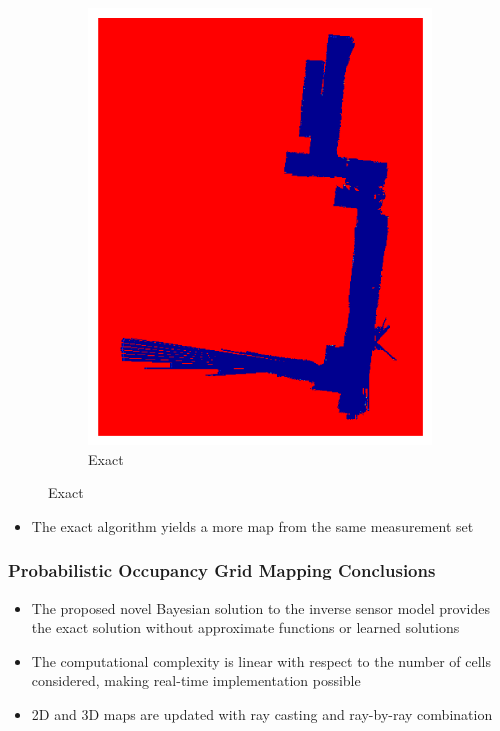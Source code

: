 \documentclass[11pt,professionalfonts,hyperref={pdftex,pdfpagemode=none,pdfstartview=FitH}]{beamer}
\renewcommand{\emph}[1]{\textit{\textbf{\color{blue}{#1}}}}
\begin{document}
\begin{frame}
\begin{minipage}[t]{5.0cm}
\begin{figure}[!htbp]
    \begin{subfigure}{0.5\textwidth}
        \centering
        \includegraphics[width=\textwidth]{EISM_Image_inf_19.pdf}
        \caption*{Exact}
    \end{subfigure}
\end{figure}
\end{minipage}


\begin{itemize}
\item The exact algorithm yields a more \emph{certain} map from the same measurement set
\end{itemize}

\end{frame}

\begin{frame}
\frametitle{Probabilistic Occupancy Grid Mapping Conclusions}

\begin{itemize}
	\item The proposed novel Bayesian solution to the inverse sensor model provides the exact solution without approximate functions or learned solutions
	\item The computational complexity is linear with respect to the number of cells considered, making real-time implementation possible
	\item 2D and 3D maps are updated with ray casting and ray-by-ray combination
\end{itemize}

\end{frame}
\end{document}
